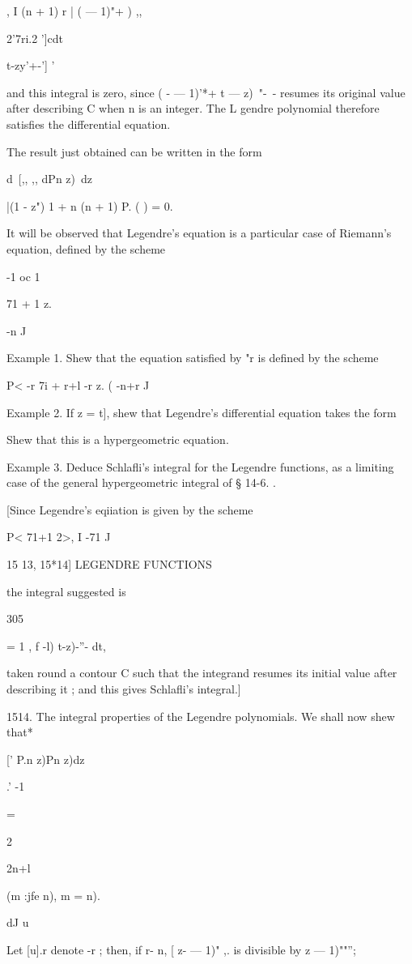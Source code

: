 , I (n + 1) r | ( — 1)"+ ) ,,

  2'7ri.2 ']cdt\ \ {t-zy'+-'] '

and this integral is zero, since ( - — 1)'*+ t — z)~"-~- resumes its
original value after describing C when n is an integer. The L gendre
polynomial therefore satisfies the differential equation.

The result just obtained can be written in the form

d\ [,, ,, dPn z)\ dz

|(1 - z") 1 + n (n + 1) P. ( ) = 0.

It will be observed that Legendre's equation is a particular case of
Riemann's equation, defined by the scheme

-1 oc 1

71 + 1 z.

-n J

Example 1. Shew that the equation satisfied by "r is defined by the
scheme

P< -r 7i + r+l -r z. ( -n+r J

Example 2. If z = t], shew that Legendre's differential equation takes
the form

Shew that this is a hypergeometric equation.

Example 3. Deduce Schlafli's integral for the Legendre functions, as a
limiting case of the general hypergeometric integral of § 14-6. .

[Since Legendre's eqiiation is given by the scheme

P< 71+1 2>, I -71 J

15 13, 15*14] LEGENDRE FUNCTIONS

the integral suggested is

305

= 1 , f -l) t-z)-''- dt,

taken round a contour C such that the integrand resumes its initial
value after describing it ; and this gives Schlafli's integral.]

1514. The integral properties of the Legendre polynomials. We shall
now shew that*

[' P.n z)Pn z)dz

.' -1

=

2

2n+l

(m :jfe n), m = n).

dJ u

Let [u].r denote -r ; then, if r- n, [ z- — 1)" ,. is divisible by z —
1)""'';

}
